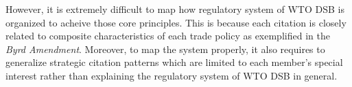 However, it is extremely difficult to 
map how regulatory system of 
WTO DSB is organized to acheive 
those core principles. 
This is because each citation is closely related 
to composite characteristics 
of each trade policy as exemplified in 
the \textit{Byrd Amendment}. 
Moreover, to map the system properly, 
it also requires to generalize strategic 
citation patterns which are limited 
to each member's special interest 
rather than explaining the 
regulatory system of WTO DSB in general.

